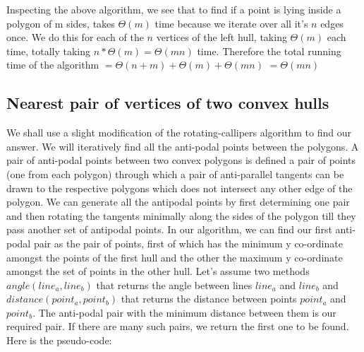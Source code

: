 \documentclass{article}
\begin{document}
Inspecting the above algorithm, we see that to find if a point is lying inside a polygon of m sides, takes $\Theta (m)$ time because we iterate over all it's $n$ edges once. We do this for each of the $n$ vertices of the left hull, taking $\Theta (m)$ each time, totally taking $n*\Theta(m) = \Theta(mn)$ time.
\newline
Therefore the total running time of the algorithm $= \Theta(n+m) + \Theta(m) + \Theta(mn)$ \newline $= \Theta(mn)$

\subsection{Nearest pair of vertices of two convex hulls}

We shall use a slight modification of the rotating-callipers algorithm to find our answer. We will iteratively find all the anti-podal points between the polygons. A pair of anti-podal points between two convex polygons is defined a pair of points (one from each polygon) through which a pair of anti-parallel tangents can be drawn to the respective polygons which does not intersect any other edge of the polygon. We can generate all the antipodal points by first determining one pair and then rotating the tangents minimally along the sides of the polygon till they pass another set of antipodal points. In our algorithm, we can find our first anti-podal pair as the pair of points, first of which has the minimum y co-ordinate amongst the points of the first hull and the other the maximum y co-ordinate amongst the set of points in the other hull. Let's assume two methods $angle(line_a, line_b)$ that returns the angle between lines $line_a$ and $line_b$ and $distance(point_a, point_b)$ that returns the distance between points $point_a$ and $point_b$. The anti-podal pair with the minimum distance between them is our required pair. If there are many such pairs, we return the first one to be found.
\newline 
Here is the pseudo-code:
\newline
\end{document}
